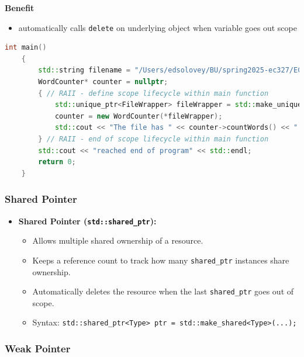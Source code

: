 \documentclass{report}
\begin{document}
\textbf{Benefit}
\begin{itemize}
    \item automatically calls \texttt{delete} on underlying object when variable goes out scope
\end{itemize}

\begin{lstlisting}[language=C++]
	int main()
	{
		std::string filename = "/Users/edsolovey/BU/spring2025-ec327/EC327-Lectures/code/lecture13/books.txt";
		WordCounter* counter = nullptr;
		{ // RAII - define scope lifecycle within main function
			std::unique_ptr<FileWrapper> fileWrapper = std::make_unique<FileWrapper>(filename);
			counter = new WordCounter(*fileWrapper);
			std::cout << "The file has " << counter->countWords() << " words.\n";
		} // RAII - end of scope lifecycle within main function
		std::cout << "reached end of program" << std::endl;
		return 0;
	}
\end{lstlisting}

\subsubsection{Shared Pointer}

\begin{itemize}
	\item \textbf{Shared Pointer (\texttt{std::shared\_ptr}):}
	\begin{itemize}
		\item Allows multiple shared ownership of a resource.
		\item Keeps a reference count to track how many \texttt{shared\_ptr} instances share ownership.
		\item Automatically deletes the resource when the last \texttt{shared\_ptr} goes out of scope.
		\item Syntax: \texttt{std::shared\_ptr<Type> ptr = std::make\_shared<Type>(...);}
	\end{itemize}
\end{itemize}



\subsubsection{Weak Pointer}
\end{document}
